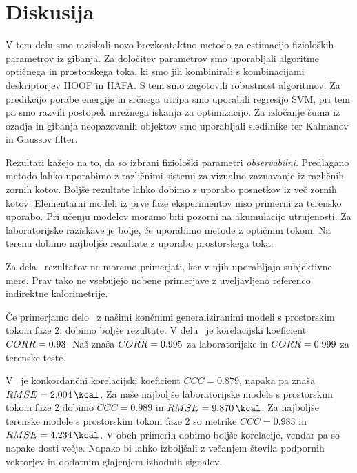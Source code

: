 \chapter{Diskusija}\label{sec:diskusija}
V tem delu smo raziskali novo brezkontaktno metodo za estimacijo fizioloških parametrov iz gibanja. Za določitev parametrov smo uporabljali algoritme optičnega in prostorskega toka, ki smo jih kombinirali s kombinacijami deskriptorjev HOOF in HAFA. S tem smo zagotovili robustnost algoritmov. Za predikcijo porabe energije in srčnega utripa smo uporabili regresijo SVM, pri tem pa smo razvili \nurbf postopek mrežnega iskanja za optimizacijo. Za izločanje šuma iz ozadja in gibanja neopazovanih objektov smo uporabljali sledilnike ter Kalmanov in Gaussov filter.

Rezultati kažejo na to, da so izbrani fiziološki parametri \emph{observabilni}. Predlagano metodo lahko uporabimo z različnimi sistemi za vizualno zaznavanje iz različnih zornih kotov. Boljše rezultate lahko dobimo z uporabo posnetkov iz več zornih kotov. Elementarni modeli iz prve faze eksperimentov niso primerni za terensko uporabo. Pri učenju modelov moramo biti pozorni na akumulacijo utrujenosti. Za laboratorijske raziskave je bolje, če uporabimo metode z optičnim tokom. Na terenu dobimo najboljše rezultate z uporabo prostorskega toka.

Za dela~\cite{peker2004framework,silva2015assessing,osgnach2010energy} rezultatov ne moremo primerjati, ker v njih uporabljajo subjektivne mere. Prav tako ne vsebujejo nobene primerjave z uveljavljeno referenco indirektne kalorimetrije.

Če primerjamo delo~\cite{botton2011energy} z našimi končnimi generaliziranimi modeli s prostorskim tokom faze 2, dobimo boljše rezultate. V delu~\cite{botton2011energy} je korelacijski koeficient ${CORR}=\num{0.93}$. Naš znaša ${CORR}=\num{0.995}$ za laboratorijske in ${CORR}=\num{0.999}$ za terenske teste. 

V~\cite{nathan2015estimating} je konkordančni korelacijski koeficient $CCC=\num{0.879}$, napaka pa znaša $\rmse=\SI{2.004}{\kcal}$. Za naše najboljše laboratorijske modele s prostorskim tokom faze 2 dobimo $CCC=\num{0.989}$ in $\rmse=\SI{9.870}{\kcal}$. Za najboljše terenske modele s prostorskim tokom faze 2 so metrike  $CCC=\num{0.983}$ in $\rmse=\SI{4.234}{\kcal}$. V obeh primerih dobimo boljše korelacije, vendar pa so napake dosti večje. Napako bi lahko izboljšali z večanjem števila podpornih vektorjev in dodatnim glajenjem izhodnih signalov.

